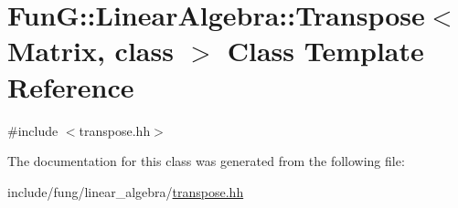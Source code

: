 \hypertarget{classFunG_1_1LinearAlgebra_1_1Transpose}{\section{Fun\-G\-:\-:Linear\-Algebra\-:\-:Transpose$<$ Matrix, class $>$ Class Template Reference}
\label{classFunG_1_1LinearAlgebra_1_1Transpose}
}


{\ttfamily \#include $<$transpose.\-hh$>$}



The documentation for this class was generated from the following file\-:\begin{DoxyCompactItemize}
\item 
include/fung/linear\-\_\-algebra/\hyperlink{transpose_8hh}{transpose.\-hh}\end{DoxyCompactItemize}
